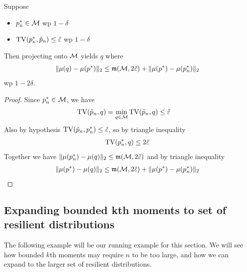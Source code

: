 \begin{proposition}\label{prop:projection-bound-expand-G-to-M}
  Suppose
  \begin{itemize}
    \item $p^*_n \in \mathcal{M}$ wp $1 - \delta$
    \item $\operatorname{TV}(p_n^*, \tilde{p}_n) \leq \tilde{\varepsilon}$ wp $1 - \delta$
  \end{itemize}
  Then projecting onto $\mathcal{M}$ yields $q$ where
  \begin{align}
    \|\mu(q) - \mu(p^*)\|_2 \leq \mathfrak{m}(\mathcal{M}, 2 \tilde{\varepsilon}) + \|\mu(p^*) - \mu(p_n^*)\|_2
  \end{align}
  wp $1 - 2 \delta$.
\end{proposition}

\begin{proof}
  Since $p_n^* \in \mathcal{M}$, we have
  \begin{align}
    \operatorname{TV}(\tilde{p}_n, q) &= \min_{q \in \mathcal{M}} \operatorname{TV}(\tilde{p}_n, q) \leq \tilde{\varepsilon}
  \end{align}
  Also by hypothesis $\operatorname{TV}(\tilde{p}_n, p_n^*) \leq \tilde{\varepsilon}$, so
  by triangle inequality
  \begin{align}
    \operatorname{TV}(p_n^*, q) \leq 2 \tilde{\varepsilon}
  \end{align}
  Together we have $\|\mu(p_n^*) - \mu(q)\|_2 \leq \mathfrak{m}(\mathcal{M}, 2\tilde{\varepsilon})$
  and by triangle inequality
  \begin{align}
    \|\mu(p^*) - \mu(q)\|_2 \leq \mathfrak{m}(\mathcal{M}, 2 \tilde{\varepsilon}) + \|\mu(p^*) - \mu(p_n^*)\|_2
  \end{align}
\end{proof}

\subsection{Expanding bounded kth moments to set of resilient distributions}

The following example will be our running example for this section.
We will see how bounded $k$th moments may require $n$ to be too large, and how
we can expand to the larger set of resilient distributions.

